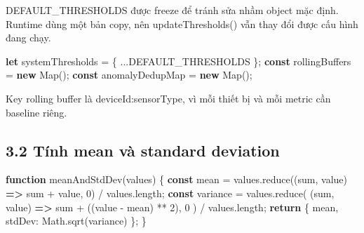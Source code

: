 \documentclass[11pt,oneside,openany]{book}
\renewcommand{\texttt}[1]{{\ttfamily\small #1}}
\newenvironment{Shaded}{\begin{snugshade}}{\end{snugshade}}
\newcommand{\AttributeTok}[1]{\textcolor[rgb]{0.16,0.50,0.73}{#1}}
\newcommand{\BuiltInTok}[1]{\textcolor[rgb]{0.50,0.55,0.55}{#1}}
\newcommand{\ControlFlowTok}[1]{\textcolor[rgb]{0.99,0.74,0.29}{\textbf{#1}}}
\newcommand{\DataTypeTok}[1]{\textcolor[rgb]{0.16,0.50,0.73}{#1}}
\newcommand{\DecValTok}[1]{\textcolor[rgb]{0.96,0.45,0.00}{#1}}
\newcommand{\FunctionTok}[1]{\textcolor[rgb]{0.56,0.27,0.68}{#1}}
\newcommand{\KeywordTok}[1]{\textcolor[rgb]{0.81,0.81,0.76}{\textbf{#1}}}
\newcommand{\NormalTok}[1]{\textcolor[rgb]{0.81,0.81,0.76}{#1}}
\newcommand{\OperatorTok}[1]{\textcolor[rgb]{0.81,0.81,0.76}{#1}}
\renewenvironment{Shaded}{%
  \def\FrameCommand{\fboxsep=8pt\colorbox{shadecolor}}%
  \MakeFramed{\advance\hsize-\width\FrameRestore}%
}{\endMakeFramed}
\begin{document}
\texttt{DEFAULT\_THRESHOLDS} được freeze để tránh sửa nhầm object mặc
định. Runtime dùng một bản copy, nên \texttt{updateThresholds()} vẫn
thay đổi được cấu hình đang chạy.

\begin{Shaded}
\begin{Highlighting}[]
\KeywordTok{let}\NormalTok{ systemThresholds }\OperatorTok{=}\NormalTok{ \{ }\OperatorTok{...}\NormalTok{DEFAULT\_THRESHOLDS \}}\OperatorTok{;}
\KeywordTok{const}\NormalTok{ rollingBuffers }\OperatorTok{=} \KeywordTok{new} \BuiltInTok{Map}\NormalTok{()}\OperatorTok{;}
\KeywordTok{const}\NormalTok{ anomalyDedupMap }\OperatorTok{=} \KeywordTok{new} \BuiltInTok{Map}\NormalTok{()}\OperatorTok{;}
\end{Highlighting}
\end{Shaded}

Key rolling buffer là \texttt{deviceId:sensorType}, vì mỗi thiết bị và
mỗi metric cần baseline riêng.

\subsection{3.2 Tính mean và standard
deviation}\label{32-tuxednh-mean-vuxe0-standard-deviation}

\begin{Shaded}
\begin{Highlighting}[]
\KeywordTok{function} \FunctionTok{meanAndStdDev}\NormalTok{(values) \{}
  \KeywordTok{const}\NormalTok{ mean }\OperatorTok{=}\NormalTok{ values}\OperatorTok{.}\FunctionTok{reduce}\NormalTok{((sum}\OperatorTok{,}\NormalTok{ value) }\KeywordTok{=\textgreater{}}\NormalTok{ sum }\OperatorTok{+}\NormalTok{ value}\OperatorTok{,} \DecValTok{0}\NormalTok{) }\OperatorTok{/}\NormalTok{ values}\OperatorTok{.}\AttributeTok{length}\OperatorTok{;}
  \KeywordTok{const}\NormalTok{ variance }\OperatorTok{=}\NormalTok{ values}\OperatorTok{.}\FunctionTok{reduce}\NormalTok{(}
\NormalTok{    (sum}\OperatorTok{,}\NormalTok{ value) }\KeywordTok{=\textgreater{}}\NormalTok{ sum }\OperatorTok{+}\NormalTok{ ((value }\OperatorTok{{-}}\NormalTok{ mean) }\OperatorTok{**} \DecValTok{2}\NormalTok{)}\OperatorTok{,}
    \DecValTok{0}
\NormalTok{  ) }\OperatorTok{/}\NormalTok{ values}\OperatorTok{.}\AttributeTok{length}\OperatorTok{;}
  \ControlFlowTok{return}\NormalTok{ \{ mean}\OperatorTok{,} \DataTypeTok{stdDev}\OperatorTok{:} \BuiltInTok{Math}\OperatorTok{.}\FunctionTok{sqrt}\NormalTok{(variance) \}}\OperatorTok{;}
\NormalTok{\}}
\end{Highlighting}
\end{Shaded}
\end{document}
